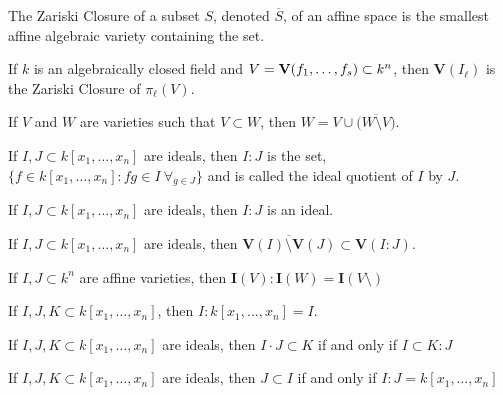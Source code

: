 \documentclass[../main.tex]{subfiles}
\begin{document}
\begin{definition}
The Zariski Closure of a subset $S$, denoted $\overline{S}$, of an affine space is the smallest affine algebraic variety containing the set. 
\end{definition}

\begin{theorem}
If $k$ is an algebraically closed field and $V = \textbf{V}(f_1,\hdots, f_s)\subset k^n$, then $\textbf{V}(I_{\ell})$ is the Zariski Closure of $\pi_{\ell}(V)$.
\end{theorem}

\begin{theorem}
If $V$ and $W$ are varieties such that $V\subset W$, then $W = V\cup \overline{\big(W\setminus V\big)}$.
\end{theorem}

\begin{definition}
If $I,J\subset k[x_1,\hdots ,x_n]$ are ideals, then $I:J$ is the set, $\{f\in k[x_1,\hdots ,x_n]: fg \in I\ \forall_{g\in J}\}$ and is called the ideal quotient of $I$ by $J$.
\end{definition}

\begin{theorem}
If $I,J\subset k[x_1,\hdots ,x_n]$ are ideals, then $I:J$ is an ideal.
\end{theorem}

\begin{theorem}
If $I,J\subset k[x_1,\hdots ,x_n]$ are ideals, then $\overline{\textbf{V}(I)\setminus \textbf{V}(J)} \subset \textbf{V}(I:J)$.
\end{theorem}

\begin{theorem}
If $I,J\subset k^n$ are affine varieties, then $\textbf{I}(V): \textbf{I}(W) = \textbf{I}(V\setminus)$
\end{theorem}

\begin{theorem}
If $I,J, K \subset k[x_1,\hdots ,x_n]$, then $I:k[x_1,\hdots ,x_n] = I$.
\end{theorem}

\begin{theorem}
If $I,J,K \subset k[x_1,\hdots ,x_n]$ are ideals, then $I\cdot J \subset K$ if and only if $I \subset K:J$
\end{theorem}

\begin{theorem}
If $I,J,K \subset k[x_1,\hdots ,x_n]$ are ideals, then $J\subset I$ if and only if $I:J = k[x_1,\hdots ,x_n]$
\end{theorem}
\end{document}
